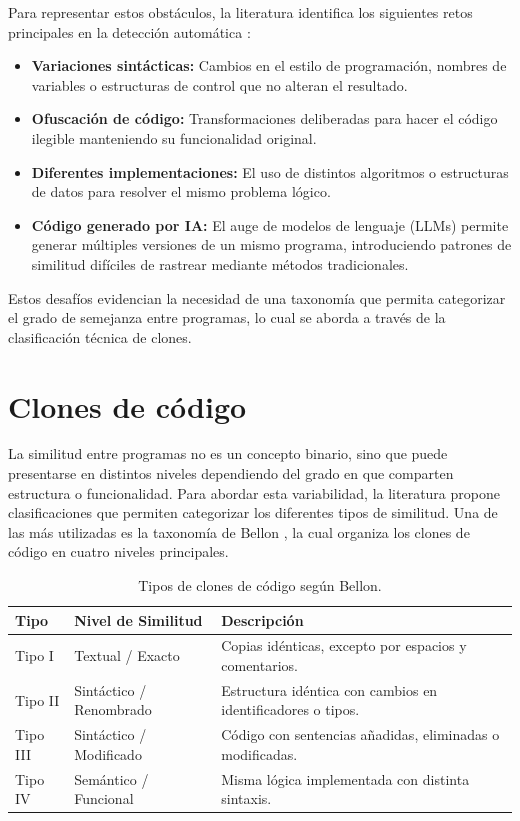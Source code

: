Para representar estos obstáculos, la literatura identifica los siguientes retos principales en la detección automática \cite{Roy2007Survey, Horvath2026ProgrammerAttribution}:

\begin{itemize}
    \item \textbf{Variaciones sintácticas:} Cambios en el estilo de programación, nombres de variables o estructuras de control que no alteran el resultado.
    \item \textbf{Ofuscación de código:} Transformaciones deliberadas para hacer el código ilegible manteniendo su funcionalidad original.
    \item \textbf{Diferentes implementaciones:} El uso de distintos algoritmos o estructuras de datos para resolver el mismo problema lógico.
    \item \textbf{Código generado por IA:} El auge de modelos de lenguaje (LLMs) permite generar múltiples versiones de un mismo programa, introduciendo patrones de similitud difíciles de rastrear mediante métodos tradicionales.
\end{itemize}

Estos desafíos evidencian la necesidad de una taxonomía que permita categorizar el grado de semejanza entre programas, lo cual se aborda a través de la clasificación técnica de clones.

\section{Clones de código}

La similitud entre programas no es un concepto binario, sino que puede presentarse en distintos niveles dependiendo del grado en que comparten estructura o funcionalidad. Para abordar esta variabilidad, la literatura propone clasificaciones que permiten categorizar los diferentes tipos de similitud. Una de las más utilizadas es la taxonomía de Bellon \cite{Bellon2007Comparison}, la cual organiza los clones de código en cuatro niveles principales.

\begin{table}[h]
\centering
\caption{Tipos de clones de código según Bellon.}
\label{tab:clones_bellon}
\begin{tabularx}{\textwidth}{|l|l|>{\raggedright\arraybackslash}X|}
\hline
\textbf{Tipo} & \textbf{Nivel de Similitud} & \textbf{Descripción} \\ \hline
Tipo I & Textual / Exacto & Copias idénticas, excepto por espacios y comentarios. \\ \hline
Tipo II & Sintáctico / Renombrado & Estructura idéntica con cambios en identificadores o tipos. \\ \hline
Tipo III & Sintáctico / Modificado & Código con sentencias añadidas, eliminadas o modificadas. \\ \hline
Tipo IV & Semántico / Funcional & Misma lógica implementada con distinta sintaxis. \\ \hline
\end{tabularx}
\end{table}

